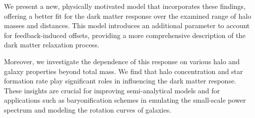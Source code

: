 \documentclass[a4paper, 12pt, oneside]{Thesis}  %
\begin{document}
We present a new, physically motivated model that incorporates these findings, offering a better fit for the dark matter response over the examined range of halo masses and distances. This model introduces an additional parameter to account for feedback-induced offsets, providing a more comprehensive description of the dark matter relaxation process.

Moreover, we investigate the dependence of this response on various halo and galaxy properties beyond total mass. We find that halo concentration and star formation rate play significant roles in influencing the dark matter response. These insights are crucial for improving semi-analytical models and for applications such as baryonification schemes in emulating the small-scale power spectrum and modeling the rotation curves of galaxies.







\end{document}
